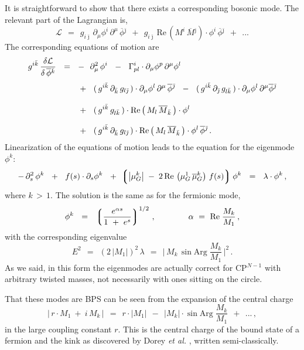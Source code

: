 \documentclass[epsfig,12pt]{article}
\def\beq{\begin{equation}}
\def\eeq{\end{equation}}
\def\beq{\begin{equation}}
\def\eeq{\end{equation}}
\newcommand{\p}{\partial}
\newcommand{\ov}{\overline}
\newcommand{\mc}[1]{\mathcal{#1}}
\newcommand{\lgr}{\left\lgroup}
\newcommand{\rgr}{\right\rgroup}
\newcommand{\bphi}{\ov{\phi}{}}
\newcommand{\bj}{{\bar \jmath}}
\newcommand{\bk}{{\bar k}}
\begin{document}
	It is straightforward to show that there exists a corresponding bosonic mode. 
	The relevant part of the Lagrangian is,
\beq
	\mc{L} ~~=~~ g_{i\bj}\, \p_\mu \phi^i\, \p^\mu\, \bphi{}^\bj 
	       ~~+~~ g_{i\bj}\, \text{Re}\, ( M^i\, \ov{M}{}^\bj ) \cdot \phi^i\, \bphi^\bj ~~+~~ ...
\eeq
	The corresponding equations of motion are
\begin{align}
%
\notag
	g^{i\bk}\, \frac{\delta \mc{L}}
                        {\delta\, \bphi{}^\bk} 
	& ~~=~~
	-~~ \p_\mu^2\, \phi^i 
	~~-~~ \Gamma^i_{pl} \cdot \p_\mu \phi^p\, \p^\mu \phi^l
	\\[1mm]
%
	&~~~~~~
	~~+~~
	(\, g^{i\bk}\, \p_{\bk}\, g_{l\bj} \,) \cdot \p_\mu \phi^l\, \p^\mu\, \bphi{}^\bj 
	~~-~~ (\, g^{i\bk}\, \p_\bj\, g_{l\bk} \,) \cdot \p_\mu \phi^l\, \p^\mu \bphi{}^\bj 
	\\[3mm]
%
\notag
	&~~~~~~
	~~+~~ (\, g^{i\bk}\, g_{l\bk} \,) \cdot \text{Re} \left(\, M_l\, \ov{M}{}_{\bk} \,\right) \cdot \phi^l
	\\[2.5mm]
%
\notag
	&~~~~~~
	~~+~~ (\, g^{i\bk}\, \p_\bk\, g_{l\bj} \,) \cdot 
		\text{Re} \left(\, M_l\, \ov{M}{}_{\bk} \,\right) \cdot \phi^l\, \bphi{}^\bj\,.
\end{align}
	Linearization of the equations of motion leads to the equation for the eigenmode $ \phi^k $:
\beq
	-\, \p_s^2\, \phi^k  ~~+~~ f(s) \cdot \p_s \phi^k ~~+~~ \!\! 
	\lgr \left| \mu_G^k \right| \;-\; 2\, \text{Re}\, \left( \mu_G^1\, \ov{\mu}{}_G^k \right)\, f(s) \rgr \phi^k 
	~~=~~ \lambda \cdot \phi^k\,,
\eeq
	where $ k \,>\, 1 $.
	The solution is the same as for the fermionic mode,
\beq
	\phi^k  ~~=~~  \lgr \frac{  e^{\alpha s}  }
	                         {   1 ~+~ e^s    }  \rgr^{ 1/2 }\,,
	\qquad\qquad
	\alpha ~=~ \text{Re}\; \frac{M_k}{M_1}\,,
\eeq
	with the corresponding eigenvalue
\beq
\label{E}
	E^2 ~~=~~ \left( 2\, | M_1 | \right)^2\, \lambda ~~=~~ \Big|\, M_k\, \sin \text{Arg}\; \frac{ M_k }{ M_1 } \,\Big|^2\,.
\eeq
	As we said, in this form the eigenmodes are actually correct for CP$^{N-1}$ with arbitrary twisted masses,
	not necessarily with ones sitting on the circle.

	That these modes are BPS can be seen from the expansion of the central charge
\beq
\label{asympt}
       |\, r \cdot M_1  ~+~ i\, M_k \,|  ~~=~~ r \cdot | M_1 |  ~~-~~ | M_k | \cdot \sin \text{Arg}\; \frac { M_k } 
                                                                                                            { M_1 }  
                                                                ~~+~~ ... \,,
\eeq
	in the large coupling constant $ r $.
	This is the central charge of the bound state of a fermion and the kink 
	as discovered by Dorey {\it et al.} \cite{Dorey:1999zk}, written semi-classically.
\end{document}

